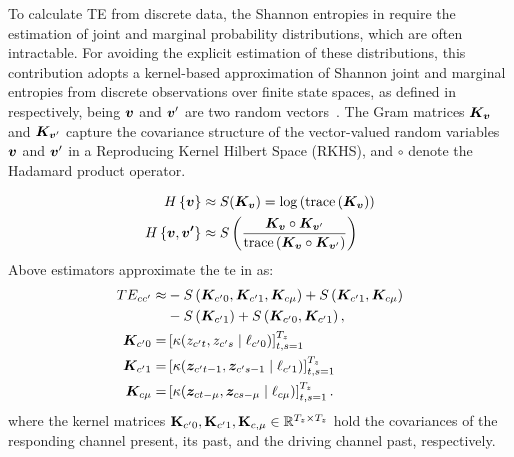 To calculate TE from discrete data, the Shannon entropies in  require the estimation of joint and marginal probability distributions, which are often intractable. For avoiding the explicit estimation of these distributions, {this contribution} adopts a kernel-based approximation of Shannon joint and marginal entropies from discrete observations over finite state spaces, as defined in  respectively, being ${\bm{v}}$ and ${\bm{v}}'$ are two random vectors~\cite{giraldo2015measures}. The Gram matrices ${\bm{K}}_{{\bm{v}}}$ and ${\bm{K}}_{{\bm{v}}'}$ capture the covariance structure of the vector-valued random variables ${\bm{v}}$ and ${\bm{v}}'$ in a Reproducing Kernel Hilbert Space (RKHS), and $\circ$ denote the Hadamard product operator.

\begin{align}
    H\left\{{\bm{v}}\right\} &\approx S({\bm{K}}_{{\bm{v}}}) = \log\left(\text{trace}\left({\bm{K}}_{{\bm{v}}}\right)\right) \label{eq:SA}\\
    H\left\{{\bm{v}},{\bm{v'}}\right\} &\approx S\left(\frac{{\bm{K}}_{{\bm{v}}} \circ {\bm{K}}_{{\bm{v}}'}}{\text{trace}\left({\bm{K}}_{{\bm{v}}} \circ {\bm{K}}_{{\bm{v}}'}\right)}\right)\label{eq:SAB} 
\end{align}
Above estimators approximate the \gls{te}  in  as:
\begin{align}
TE_{cc'} \approx& -S\left( {\bm{K}}_{c'{0}}, {\bm{K}}_{c'{1}}, {\bm{K}}_{c{\mu}} \right)
+ S\left( {\bm{K}}_{c'{1}}, {\bm{K}}_{c{\mu}} \right) \label{eq:TE_k}\\
&- S\left( {\bm{K}}_{c'{1}} \right) + S\left( {\bm{K}}_{c'{0}}, {\bm{K}}_{c'{1}} \right),\nonumber\\
{\bm{K}}_{c'0} =& \left[ \kappa({z}_{c't},{z}_{c's}\mid \ell_{c'0}) \right]_{t,s=1}^{T_z}\label{eq:ky}\\
{\bm{K}}_{c'1} =& \left[ \kappa({\bm{z}}_{c't-1},{\bm{z}}_{c's-1}\mid \ell_{c'1}) \right]_{t,s=1}^{T_z}\label{eq:ky-1}\\
{\bm{K}}_{c\mu} =& \left[ \kappa({\bm{z}}_{ct-\mu},{\bm{z}}_{cs-\mu}\mid \ell_{c\mu}) \right]_{t,s=1}^{T_z}\label{eq:kx}.
\end{align}
where the kernel matrices $\mathbf{K}_{c'0},\mathbf{K}_{c'{1}},\mathbf{K}_{c,{\mu}} \in \mathbb{R}^{T_z \times T_z}$ hold the covariances of the responding channel present, its past, and the driving channel past, respectively. 

